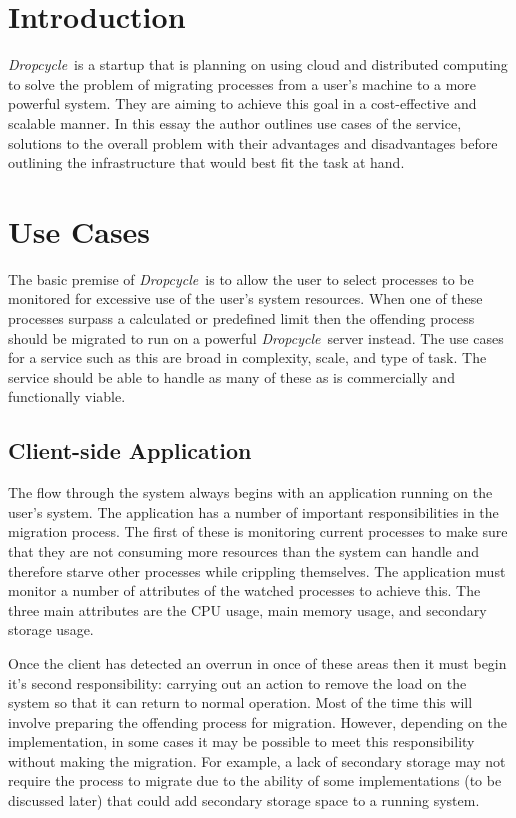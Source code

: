 \documentclass[12pt, a4paper]{article}
\title{\thetitle}
\author{\theauthor}
\date{\today}
\def\dropcycle{\emph{Dropcycle}\ }
\begin{document}
\maketitle
\thispagestyle{empty}

\section{Introduction}

\dropcycle is a startup that is planning on using cloud and distributed
computing to solve the problem of migrating processes from a user's machine to
a more powerful system. They are aiming to achieve this goal in
a cost-effective and scalable manner. In this essay the author outlines use
cases of the service, solutions to the overall problem with their advantages
and disadvantages before outlining the infrastructure that would best fit the
task at hand.

\section{Use Cases}

The basic premise of \dropcycle is to allow the user to select processes to be
monitored for excessive use of the user's system resources. When one of these
processes surpass a calculated or predefined limit then the offending process
should be migrated to run on a powerful \dropcycle server instead. The use
cases for a service such as this are broad in complexity, scale, and type of
task. The service should be able to handle as many of these as is commercially
and functionally viable.

\subsection{Client-side Application}

The flow through the system always begins with an application running on the
user's system. The application has a number of important responsibilities in
the migration process. The first of these is monitoring current processes to
make sure that they are not consuming more resources than the system can handle
and therefore starve other processes while crippling themselves. The
application must monitor a number of attributes of the watched processes to
achieve this. The three main attributes are the CPU usage, main memory usage,
and secondary storage usage.

Once the client has detected an overrun in once of these areas then it must
begin it's second responsibility: carrying out an action to remove the load on
the system so that it can return to normal operation. Most of the time this
will involve preparing the offending process for migration. However, depending
on the implementation, in some cases it may be possible to meet this
responsibility without making the migration. For example, a lack of secondary
storage may not require the process to migrate due to the ability of some
implementations (to be discussed later) that could add secondary storage space
to a running system.
\end{document}
